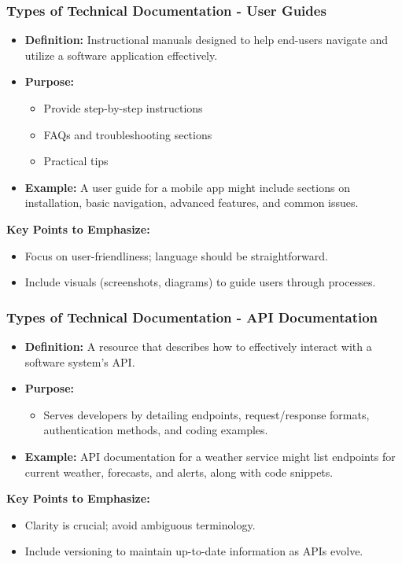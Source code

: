 \documentclass{beamer}
\begin{document}
\begin{frame}[fragile]
    \frametitle{Types of Technical Documentation - User Guides}
    \begin{itemize}
        \item \textbf{Definition:} Instructional manuals designed to help end-users navigate and utilize a software application effectively.
        \item \textbf{Purpose:} 
        \begin{itemize}
            \item Provide step-by-step instructions
            \item FAQs and troubleshooting sections
            \item Practical tips
        \end{itemize}
        \item \textbf{Example:} A user guide for a mobile app might include sections on installation, basic navigation, advanced features, and common issues.
    \end{itemize}

    \textbf{Key Points to Emphasize:}
    \begin{itemize}
        \item Focus on user-friendliness; language should be straightforward.
        \item Include visuals (screenshots, diagrams) to guide users through processes.
    \end{itemize}
\end{frame}

\begin{frame}[fragile]
    \frametitle{Types of Technical Documentation - API Documentation}
    \begin{itemize}
        \item \textbf{Definition:} A resource that describes how to effectively interact with a software system's API.
        \item \textbf{Purpose:}  
        \begin{itemize}
            \item Serves developers by detailing endpoints, request/response formats, authentication methods, and coding examples.
        \end{itemize}
        \item \textbf{Example:} API documentation for a weather service might list endpoints for current weather, forecasts, and alerts, along with code snippets.
    \end{itemize}

    \textbf{Key Points to Emphasize:}
    \begin{itemize}
        \item Clarity is crucial; avoid ambiguous terminology.
        \item Include versioning to maintain up-to-date information as APIs evolve.
    \end{itemize}
\end{frame}
\end{document}
